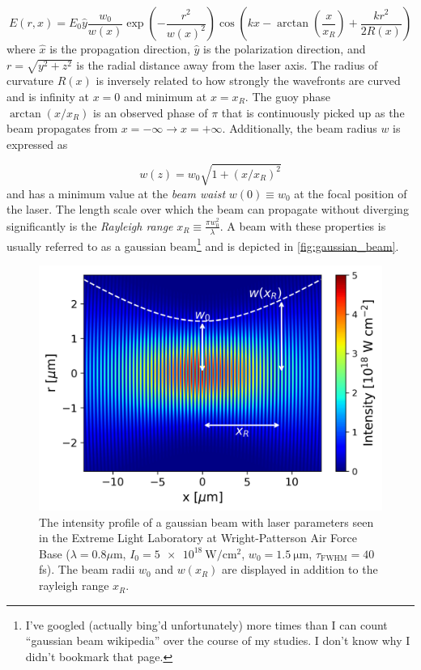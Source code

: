 \begin{equation}
	E(r, x) = E_0 \hat{y} \frac{w_0}{w(x)} \exp( - \frac{r^2}{w(x)^2}) \cos(k x - \arctan(\frac{x}{x_R}) + \frac{k r^2}{2 R(x)}) \label{eq:gaussian_beam}
\end{equation}
where $\hat{x}$ is the propagation direction, $\hat{y}$ is the polarization direction, and $r = \sqrt{y^2 + z^2}$ is the radial distance away from the laser axis. The radius of curvature $R(x)$ is inversely related to how strongly the wavefronts are curved and is infinity at $x=0$ and minimum at $x=x_R$. The guoy phase $\arctan(x/x_R)$ is an observed phase of $\pi$ that is continuously picked up as the beam propagates from $x=-\infty \rightarrow x=+\infty$. Additionally, the beam radius $w$ is expressed as

\begin{equation}
	w(z) = w_0 \sqrt{1 + (x/x_R)^2} \label{eq:beam_radius}
\end{equation}  
and has a minimum value at the \emph{beam waist} $w(0) \equiv w_0$ at the focal position of the laser. The length scale over which the beam can propagate without diverging significantly is the \emph{Rayleigh range} $x_R \equiv \frac{\pi w_0^2}{\lambda}$. A beam with these properties is usually referred to as a gaussian beam\footnote{I've googled (actually bing'd unfortunately) more times than I can count ``gaussian beam wikipedia'' over the course of my studies. I don't know why I didn't bookmark that page.} and is depicted in \autoref{fig:gaussian_beam}.

\begin{figure}
	\centering
	\includegraphics[width=0.75\linewidth]{planning/images/gaussian_beam.png}
	\caption{The intensity profile of a gaussian beam with laser parameters seen in the Extreme Light Laboratory at Wright-Patterson Air Force Base ($\lambda = 0.8 \mu$m, $I_0=\SI{5e18}{\watt \per \centi \meter \squared}$, $w_0 = \SI{1.5}{\micro \meter}$, $\tau_\text{FWHM}=40$fs). The beam radii $w_0$ and $w(x_R)$ are displayed in addition to the rayleigh range $x_R$.}
	\label{fig:gaussian_beam}
\end{figure}

